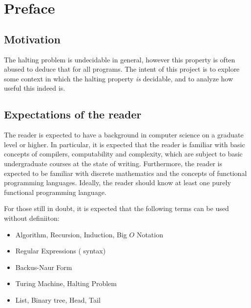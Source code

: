 \chapter{Preface}

\section{Motivation}

The halting problem is undecidable in general, however this property is often
abused to deduce that for all programs. The intent of this project is to
explore some context in which the halting property \emph{is} decidable, and to
analyze how useful this indeed is.

\section{Expectations of the reader}

The reader is expected to have a background in computer science on a graduate
level or higher. In particular, it is expected that the reader is familiar with
basic concepts of compilers, computability and complexity, which are subject to
basic undergraduate courses at the state of writing. Furthermore, the reader is
expected to be familiar with discrete mathematics and the concepts of
functional programming languages. Ideally, the reader should know at least one
purely functional programming language.

For those still in doubt, it is expected that the following terms can be used
without definiiton:

\begin{itemize}

\item Algorithm, Recursion, Induction, Big $O$ Notation

\item Regular Expressions ( syntax)

\item Backus-Naur Form

\item Turing Machine, Halting Problem

\item List, Binary tree, Head, Tail

\end{itemize}


